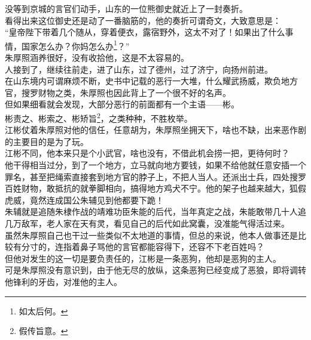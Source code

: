 \begin{multicols}{\theparacolNo}
没等到京城的言官们动手，山东的一位熊御史就近上了一封奏折。\\

看得出来这位御史还是动了一番脑筋的，他的奏折可谓奇文，大致意思是：\\

“皇帝陛下带着几个随从，穿着便衣，露宿野外，这太不对了！如果出了什么事情，国家怎么办？你妈怎么办\footnote{如太后何。}？”\\

朱厚照涵养很好，没有收拾他，这是不太容易的。\\

人接到了，继续往前走，进了山东，过了德州，过了济宁，向扬州前进。\\

在山东境内可谓麻烦不断，史书中记载的恶行一大堆，什么耀武扬威，欺负地方官，搜罗财物之类，朱厚照也因此背上了一个很不好的名声。\\

但如果细看就会发现，大部分恶行的前面都有一个主语——彬。\\

彬责之、彬索之、彬矫旨\footnote{假传旨意。}，之类种种，不胜枚举。\\

江彬仗着朱厚照对他的信任，任意胡为，朱厚照坐拥天下，啥也不缺，出来恶作剧的主要目的是为了玩。\\

江彬不同，他本来只是个小武官，啥也没有，不借此机会捞一把，更待何时？\\

他干得相当过分，到了一个地方，立马就向地方要钱，如果不给他就任意安插一个罪名，甚至把绳索直接套到地方官的脖子上，不把人当人。还派出士兵，四处搜罗百姓财物，敢抵抗的就拳脚相向，搞得地方鸡犬不宁。他的架子也越来越大，狐假虎威，竟然连成国公朱辅见到他都要下跪！\\

朱辅就是追随朱棣作战的靖难功臣朱能的后代，当年真定之战，朱能敢带几十人追几万敌军，老人家在天有灵，看见自己的后代如此窝囊，没准能气得活过来。\\

虽然朱厚照自己也干过一些类似不太地道的事情，但总的来说，他本人做事还是比较有分寸的，连指着鼻子骂他的言官都能容得下，还容不下老百姓吗？\\

但他对发生的这一切是要负责任的，江彬是一条恶狗，他却是恶狗的主人。\\

可是朱厚照没有意识到，由于他无尽的放纵，这条恶狗已经变成了恶狼，即将调转他锋利的牙齿，对准他的主人。\\


\end{multicols}
